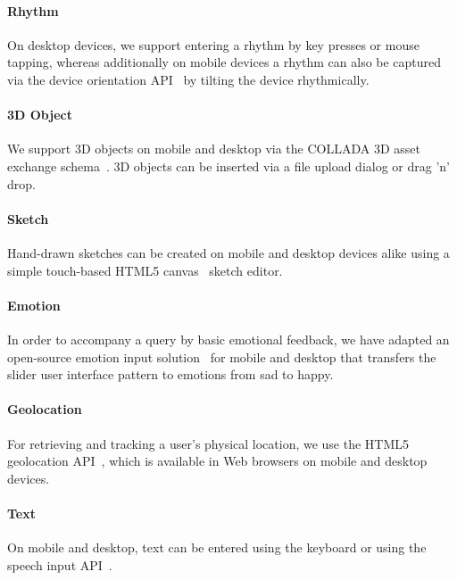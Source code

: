 \documentclass{acm_proc_article-sp}
\begin{document}
\paragraph{Rhythm}
On desktop devices, we support entering a rhythm by key presses or mouse tapping, whereas additionally on mobile devices a rhythm can also be captured via the device orientation API~\cite{deviceorientation} by tilting the device rhythmically.
\vspace{-1.5em}

\paragraph{3D Object}
We support 3D objects on mobile and desktop via the COLLADA 3D asset exchange schema~\cite{collada}.
3D objects can be inserted via a file upload dialog or drag 'n' drop. 
\vspace{-1.5em}

\paragraph{Sketch}
Hand-drawn sketches can be created on mobile and desktop devices alike using a simple touch-based HTML5 canvas~\cite{canvas} sketch editor.
\vspace{-1.5em}

\paragraph{Emotion}
In order to accompany a query by basic emotional feedback, we have adapted an open-source emotion input solution~\cite{emotionslider} for mobile and desktop that transfers the slider user interface pattern to emotions from sad to happy. 
\vspace{-1.5em}

\paragraph{Geolocation}
For retrieving and tracking a user's physical location, we use the HTML5 geolocation API~\cite{geolocation}, which is available in Web browsers on mobile and desktop devices.
\vspace{-1.5em}

\paragraph{Text}
On mobile and desktop, text can be entered using the keyboard or using the speech input API~\cite{speechinput}.
\end{document}
